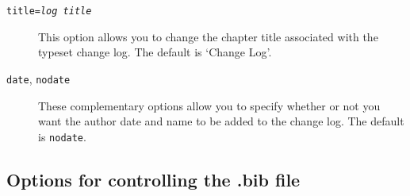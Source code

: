 \documentclass[a4paper,12pt,twoside,openany]{memoir}
\begin{document}
\begin{description}

\item[\texttt{title=\textit{log title}}]
This option allows you to change the chapter title associated with 
the typeset change log.
The default is `Change Log'.

\item[\texttt{date}, \texttt{nodate}]
These complementary options
allow you to specify whether or not you want 
the author date and name to be added to the change log.
The default is \texttt{nodate}.


\end{description}

\subsection{Options for controlling the .bib file}
\end{document}
